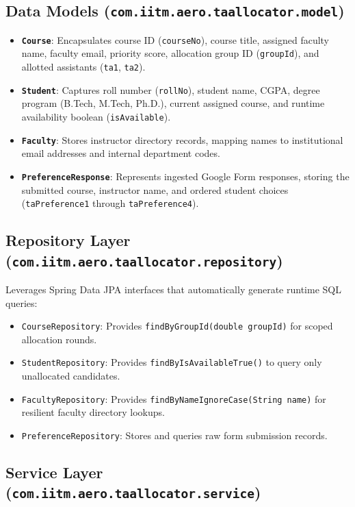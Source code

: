 \documentclass[12pt, a4paper]{article}
\begin{document}
\subsection{Data Models (\texttt{com.iitm.aero.taallocator.model})}
\begin{itemize}
    \item \textbf{\texttt{Course}}: Encapsulates course ID (\texttt{courseNo}), course title, assigned faculty name, faculty email, priority score, allocation group ID (\texttt{groupId}), and allotted assistants (\texttt{ta1}, \texttt{ta2}).
    \item \textbf{\texttt{Student}}: Captures roll number (\texttt{rollNo}), student name, CGPA, degree program (B.Tech, M.Tech, Ph.D.), current assigned course, and runtime availability boolean (\texttt{isAvailable}).
    \item \textbf{\texttt{Faculty}}: Stores instructor directory records, mapping names to institutional email addresses and internal department codes.
    \item \textbf{\texttt{PreferenceResponse}}: Represents ingested Google Form responses, storing the submitted course, instructor name, and ordered student choices (\texttt{taPreference1} through \texttt{taPreference4}).
\end{itemize}

\subsection{Repository Layer (\texttt{com.iitm.aero.taallocator.repository})}
Leverages Spring Data JPA interfaces that automatically generate runtime SQL queries:
\begin{itemize}
    \item \texttt{CourseRepository}: Provides \texttt{findByGroupId(double groupId)} for scoped allocation rounds.
    \item \texttt{StudentRepository}: Provides \texttt{findByIsAvailableTrue()} to query only unallocated candidates.
    \item \texttt{FacultyRepository}: Provides \texttt{findByNameIgnoreCase(String name)} for resilient faculty directory lookups.
    \item \texttt{PreferenceRepository}: Stores and queries raw form submission records.
\end{itemize}

\subsection{Service Layer (\texttt{com.iitm.aero.taallocator.service})}
\end{document}
